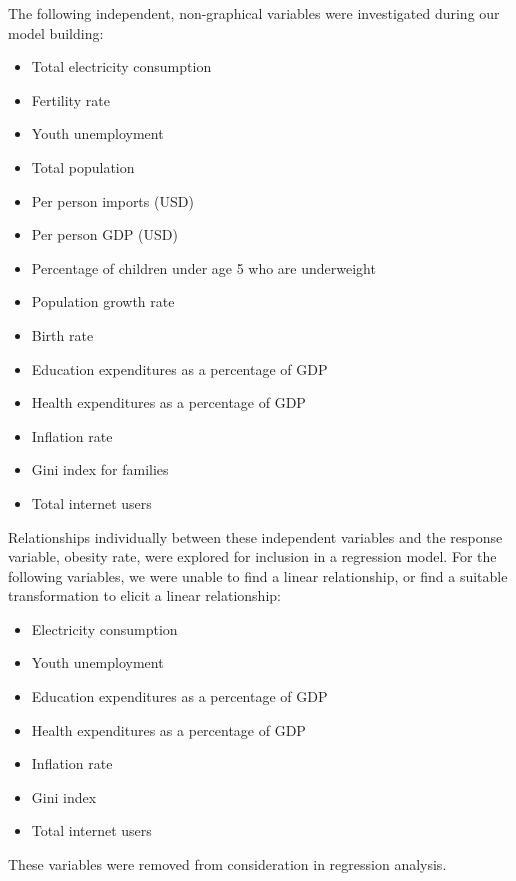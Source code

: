 \documentclass[oneside,12pt]{report}
\begin{document}
The following independent, non-graphical variables were investigated during our model building:
\begin{itemize}
\item Total electricity consumption
\item Fertility rate
\item Youth unemployment
\item Total population
\item Per person imports (USD)
\item Per person GDP (USD)
\item Percentage of children under age 5 who are underweight
\item Population growth rate
\item Birth rate
\item Education expenditures as a percentage of GDP
\item Health expenditures as a percentage of GDP
\item Inflation rate
\item Gini index for families
\item Total internet users
\end{itemize}

Relationships individually between these independent variables and the response variable, obesity rate, were explored for inclusion in a regression model. For the following variables, we were unable to find a linear relationship, or find a suitable transformation to elicit a linear relationship:

\begin{itemize}
\item Electricity consumption
\item Youth unemployment
\item Education expenditures as a percentage of GDP
\item Health expenditures as a percentage of GDP
\item Inflation rate
\item Gini index
\item Total internet users
\end{itemize}

These variables were removed from consideration in regression analysis.
\end{document}
